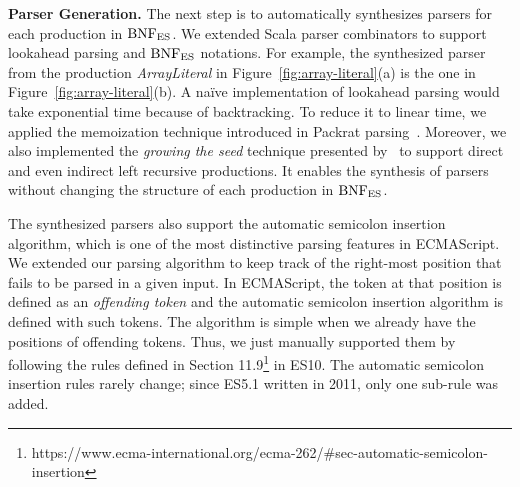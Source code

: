 \smallskip

\textbf{Parser Generation.}
The next step is to automatically synthesizes parsers for each production in \(
\text{BNF}_{\text{ES}} \).  We extended Scala parser combinators to support lookahead parsing
and \( \text{BNF}_{\text{ES}} \) notations. For example, the synthesized parser from the
production \textit{ArrayLiteral} in Figure~\ref{fig:array-literal}(a) is the one
in Figure~\ref{fig:array-literal}(b).  A na\"{i}ve implementation of lookahead
parsing would take exponential time because of backtracking.  To reduce it
to linear time, we applied the memoization technique introduced in
Packrat parsing~\cite{packrat}.  Moreover, we also implemented the
\textit{growing the seed} technique presented by~\citet{packrat-lr} to support
direct and even indirect left recursive productions.  It enables the synthesis
of parsers without changing the structure of each production in \( \text{BNF}_{\text{ES}} \).

The synthesized parsers also support the automatic semicolon insertion
algorithm, which is one of the most distinctive parsing features in ECMAScript.
We extended our parsing algorithm to keep track of the right-most position that
fails to be parsed in a given input.  In ECMAScript, the token at that position
is defined as an \textit{offending token} and the automatic semicolon insertion
algorithm is defined with such tokens.  The algorithm is simple when we already
have the positions of offending tokens.  Thus, we just manually supported them
by following the rules defined in Section
11.9\footnote{https://www.ecma-international.org/ecma-262/\#sec-automatic-semicolon-insertion}
in ES10.  The automatic semicolon insertion rules rarely change; since
ES5.1 written in 2011, only one sub-rule was added.
